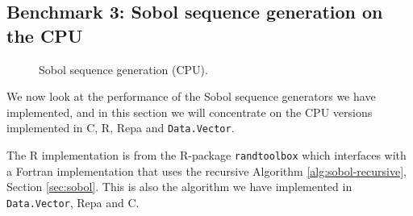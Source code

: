 \subsection{Benchmark 3: Sobol sequence generation on the CPU}
\begin{figure}
	\centering
  \begin{adjustbox}{minipage=1.3\textwidth,margin=0pt \smallskipamount,center}
\end{adjustbox}
  \caption{Sobol sequence generation (CPU).}
\label{fig:sobol-cpu}
\end{figure}

We now look at the performance of the Sobol sequence generators we
have implemented, and in this section we will concentrate on the CPU
versions implemented in C, R, Repa and \lstinline{Data.Vector}. 

The R implementation is from the R-package \lstinline{randtoolbox}
which interfaces with a Fortran implementation that uses the recursive
Algorithm \ref{alg:sobol-recursive}, Section \ref{sec:sobol}. This is
also the algorithm we have implemented in \lstinline{Data.Vector},
Repa and C.

